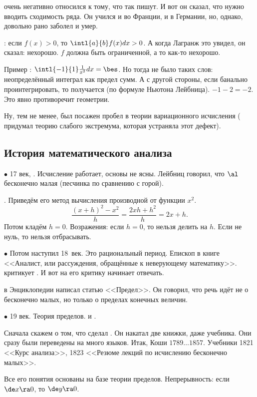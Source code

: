 \documentclass[a4paper,oneside,fleqn,10pt]{article}
\newcommand{\pe}[2]{${#1}\ldots{#2}$}
\begin{document}
 очень негативно относился к тому, что так пишут. И вот он сказал,
что нужно вводить сходимость ряда. Он учился и во Франции, и в Германии,
но, однако, довольно рано заболел и умер.

: если $f(x) > 0$, то $\intl{a}{b} f(x) dx > 0$.
А когда Лагранж это увидел, он сказал: нехорошо. $f$ должна быть ограниченной,
а то как-то нехорошо.

Пример : $\intl{-1}{1} \frac{1}{x^2}dx = \bes$.
Но тогда не было таких слов: неопределённый интеграл как предел сумм.
А с другой стороны, если банально проинтегрировать, то получается (по формуле Ньютона Лейбница).
$-1-2 = -2$. Это явно противоречит геометрии.

Ну, тем не менее, был посажен пробел в теории вариационного исчисления ( придумал
теорию слабого экстремума, которая устраняла этот дефект).

\subsection{История математического анализа}

$\bullet$ 17 век, . Исчисление работает, основы не ясны. Лейбниц говорил, что $\al$ бесконечно
малая (песчинка по сравнению с горой).

. Приведём его метод вычисления производной от функции $x^2$.
$$\frac{(x+h)^2 - x^2}{h} = \frac{2xh + h^2}{h} = 2x + h.$$
Потом кладём $h = 0$. Возражения: если $h = 0$, то нельзя делить на $h$. Если не нуль, то
нельзя отбрасывать.

$\bullet$ Потом наступил 18~век. Это рациональный период. Епископ 
в книге <<Аналист, или рассуждения, обращённые к неверующему математику>>.
критикует . И вот на его критику начинает отвечать.

 в Энциклопедии написал статью <<Предел>>. Он говорил,
что речь идёт не о бесконечно малых, но только о пределах конечных величин.

$\bullet$ 19 век. Теория пределов.  и .

Сначала скажем о том, что сделал .
Он накатал две книжки, даже учебника. Они сразу были переведены на много
языков. Итак, Коши \pe{1789}{1857}. Учебники 1821 <<Курс анализа>>,
1823 <<Резюме лекций по исчислению бесконечно малых>>.

Все его понятия основаны на базе теории пределов.
Непрерывность: если $\de x \ra 0$, то $\de y \ra 0$.
\end{document}
